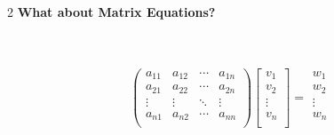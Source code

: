 \documentclass[a4paper]{article}
\begin{document}
\begin{enumerate}
\begin{large}
\item[2] \textbf{What about Matrix Equations?}
\end{large}\\
\\
\[
\begin{pmatrix}
a_{11} & a_{12} & \cdots & a_{1n}\\
a_{21} & a_{22} & \cdots & a_{2n}\\
\vdots & \vdots & \ddots & \vdots \\
a_{n1} & a_{n2} & \cdots & a_{nn}\\
\end{pmatrix}
\begin{bmatrix}
v_{1}\\
v_{2}\\
\vdots \\
v_{n}\\
\end{bmatrix}
=
\begin{matrix}
w_{1} \\
w_{2} \\
\vdots \\
w_{n} \\
\end{matrix}
\]

\end{enumerate}
\end{document}
